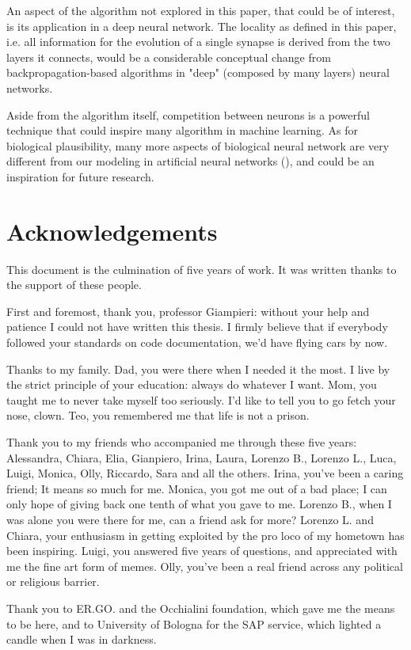 \documentclass[a4paper]{report}
\begin{document}
An aspect of the algorithm not explored in this paper, that could be of interest, is its application in a deep neural network. The locality as defined in this paper, i.e. all information for the evolution of a single synapse is derived from the two layers it connects, would be a considerable conceptual change from backpropagation-based algorithms in "deep" (composed by many layers) neural networks.

Aside from the algorithm itself, competition between neurons is a powerful technique that could inspire many algorithm in machine learning.
As for biological plausibility, many more aspects of biological neural network are very different from our modeling in artificial neural networks (\cite{sporns2007brain}), and could be an inspiration for future research.

\chapter{Acknowledgements}
This document is the culmination of five years of work.
It was written thanks to the support of these people.

First and foremost, thank you, professor Giampieri:
without your help and patience I could not have written this thesis.
I firmly believe that if everybody followed your standards on code documentation, we'd have flying cars by now.

Thanks to my family.
Dad, you were there when I needed it the most.
I live by the strict principle of your education:
always do whatever I want.
Mom, you taught me to never take myself too seriously.
I'd like to tell you to go fetch your nose, clown.
Teo, you remembered me that life is not a prison.

Thank you to my friends who accompanied me through these five years:
Alessandra, Chiara, Elia, Gianpiero, Irina, Laura, Lorenzo B., Lorenzo L., Luca, Luigi, Monica, Olly, Riccardo, Sara and all the others.
Irina, you've been a caring friend;
It means so much for me.
Monica, you got me out of a bad place;
I can only hope of giving back one tenth of what you gave to me.
Lorenzo B., when I was alone you were there for me, can a friend ask for more?
Lorenzo L. and Chiara, your enthusiasm in getting exploited by the pro loco of my hometown has been inspiring.
Luigi, you answered five years of questions, and appreciated with me the fine art form of memes.
Olly, you've been a real friend across any political or religious barrier.

Thank you to ER.GO. and the Occhialini foundation, which gave me the means to be here, and to University of Bologna for the SAP service, which lighted a candle when I was in darkness.
\end{document}
